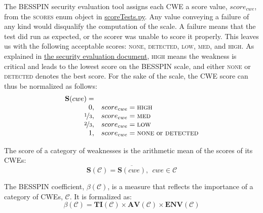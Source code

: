 \documentclass{article}
\begin{document}
The BESSPIN security evaluation tool assigns each CWE a score value, $score_{cwe}$, from the {\scshape scores} enum object in \href{https://github.com/DARPA-SSITH-Demonstrators/SSITH-FETT-Target/blob/develop/fett/cwesEvaluation/scoreTests.py}{scoreTests.py}. Any value conveying a failure of any kind would disqualify the computation of the scale. A failure means that the test did run as expected, or the scorer was unable to score it properly. This leaves us with the following acceptable scores: {\scshape none}, {\scshape detected}, {\scshape low}, {\scshape med}, and {\scshape high}. As explained in \href{https://github.com/DARPA-SSITH-Demonstrators/SSITH-FETT-Target/blob/develop/docs/evaluateSecurityTestsMode.md}{the security evaluation document}, {\scshape high} means the weakness is critical and leads to the lowest score on the BESSPIN scale, and either {\scshape none} or {\scshape detected} denotes the best score. For the sake of the scale, the CWE score can thus be normalized as follows:
\begin{equation}
\begin{array}{rl}
\mathbf{S}(cwe) = \\ 
      0, &   score_{cwe} = \text{{\scshape high}} \\
      \nicefrac{1}{3}, & score_{cwe} = \text{{\scshape med}} \\
      \nicefrac{2}{3}, & score_{cwe} = \text{{\scshape low}} \\
      1, &    score_{cwe} = \text{{\scshape none} or {\scshape detected}}
\end{array}
\end{equation}

The score of a category of weaknesses is the arithmetic mean of the scores of its CWEs:
\begin{equation}
    \mathbf{S}(\mathcal{C}) = \overline{\mathbf{S}(cwe)}, \ \ cwe \in \mathcal{C}
\end{equation}

The BESSPIN coefficient, $\beta(\mathcal{C})$, is a measure that reflects the importance of a category of CWEs, $\mathcal{C}$. It is formalized as: 
\begin{equation}
    \beta(\mathcal{C}) = \mathbf{TI}(\mathcal{C}) 
    \times \mathbf{AV}(\mathcal{C}) 
    \times \mathbf{ENV}(\mathcal{C})
\end{equation}
\end{document}
